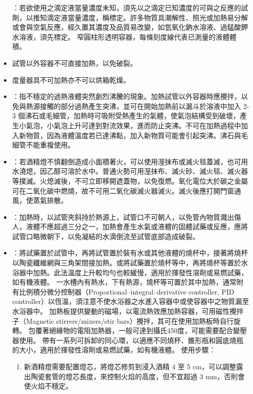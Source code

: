 \documentclass[a4paper,12pt]{article}
\begin{document}
\begin{itemize}
：若欲使用之滴定液當量濃度未知，須先以之滴定已知濃度的可與之反應的試劑，以推知滴定液當量濃度，稱標定。許多物質具潮解性、照光或加熱易分解或會與空氣反應，經久置其濃度及品質易改變，如氫氧化鈉水溶液、過錳酸鉀水溶液，須先標定。
窄圓柱形透明容器，每條刻度線代表已測量的液體體積。
\bit
\item 試管以外容器不可直接加熱，以免破裂。
\item 度量器具不可加熱亦不可以烘箱乾燥。
\item {}：指不穩定的過熱液體突然劇烈沸騰的現象。加熱試管以外容器時應攪拌，以免與熱源接觸的部分過熱產生突沸，並可在開始加熱前以漏斗於溶液中加入 2-3 個沸石或毛細管，加熱時可吸附受熱產生的氣體，使氣泡結構受到破壞，產生小氣泡，小氣泡上升可達到對流效果，進而防止突沸。不可在加熱過程中加入新物質，因為液體溫度若已達沸點，加入新物質可能會引起突沸。沸石與毛細管不能重複使用。
\item {}：若酒精燈不慎翻倒造成小面積著火，可以使用溼抹布或滅火毯蓋滅，也可用水澆熄，因乙醇可溶於水中。普通火勢可用溼抹布、滅火砂、滅火毯、滅火器等撲滅。火熄滅後，不可立即移開遮蓋物，以免復燃。氧化電位大於碳之金屬可在二氧化碳中燃燒，故不可用二氧化碳滅火器滅火。滅火後應打開門窗通風，使蒸氣排散。
\item {}：加熱時，以試管夾斜持於熱源上，試管口不可朝人，以免管內物質濺出傷人，液體不應超過三分之一，加熱會產生水氣或液體的固體試藥或反應，應將試管口略微朝下，以免凝結的水滴倒流至試管底部造成破裂。
\item {}：將試藥置於試管中，再將試管置於裝有水或其他液體的燒杯中，接著將燒杯以陶瓷纖維網與三角架間接加熱。或將試藥置於燒杯等中，再將燒杯等置於水浴器中加熱。此法溫度上升較均勻也較緩慢，適用於揮發性溶劑或易燃試藥，如有機液體。
\eit
{}
一水槽內有熱水，下有熱源，燒杯等可置於其中加熱，通常附有比例積分微分控制器（Proportional–integral–derivative controller, PID controller）以恆溫，須注意不使水浴器之水進入容器中或使容器中之物質漏至水浴器中。
加熱板提供變動的磁場，以電流熱效應加熱容器，可用磁性攪拌子（Magnetic stirrers/mixers/stir bars）攪拌，其可在使用加熱板時自行旋轉。
包覆著絕緣物的電阻加熱器，一般可達到攝氏450度，可能需要配合變壓器使用。
帶有一系列可拆卸的同心環，以適應不同燒杯、錐形瓶和圓底燒瓶的大小，適用於揮發性溶劑或易燃試藥，如有機液體。
使用步驟：
\begin{enumerate}
\item 新酒精燈需要配置燈芯，將燈芯修剪到浸入酒精 4 至 5 cm，可以調整露出陶瓷套管的燈芯長度，來控制火焰的高度，但不宜超過 3 mm，否則會使火焰不穩定。

\end{enumerate}
\end{itemize}
\end{document}
